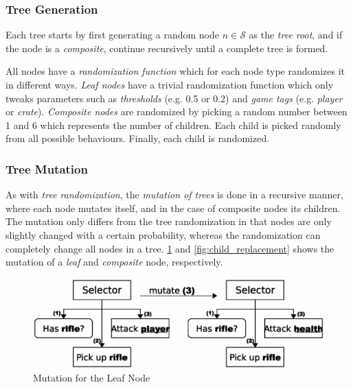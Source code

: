 \documentclass[a4paper, twocolumn]{article}
\begin{document}
        \subsubsection*{Tree Generation}

        Each tree starts by first generating a random node \(n \in \mathcal{S}\) as the \emph{tree root}, and if the node is a \textit{composite}, continue recursively until a complete tree is formed.

        All nodes have a \textit{randomization function} which for each node type randomizes it in different ways. \emph{Leaf nodes} have a trivial randomization function which only tweaks parameters such as \emph{thresholds} (e.g. 0.5 or 0.2) and \emph{game tags} (e.g. \emph{player} or \emph{crate}). \emph{Composite nodes} are randomized by picking a random number between 1 and 6 which represents the number of children. Each child is picked randomly from all possible behaviours. Finally, each child is randomized.

        \subsubsection*{Tree Mutation}

        As with \textit{tree randomization}, the \emph{mutation of trees} is done in a recursive manner, where each node mutates itself, and in the case of composite nodes its children. The mutation only differs from the tree randomization in that nodes are only slightly changed with a certain probability, whereas the randomization can completely change all nodes in a tree. \cref{fig:leaf_mutation} and \cref{fig:child_replacement} shows the mutation of a \emph{leaf} and \emph{composite} node, respectively. 

        \begin{figure}[H]
            \centering
            \includegraphics[width=\linewidth]{share/leaf_mutation.eps}
            \caption{Mutation for the Leaf Node}
            \label{fig:leaf_mutation}
        \end{figure}
\end{document}
